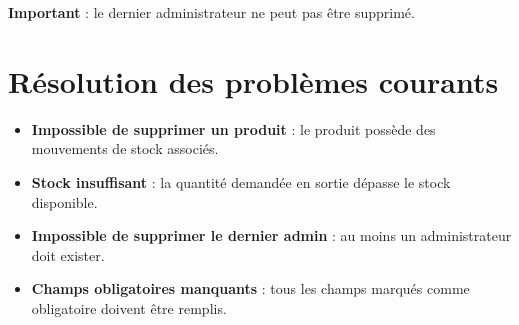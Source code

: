 \documentclass[12pt, a4paper]{article}
\begin{document}
	\textbf{Important} : le dernier administrateur ne peut pas être supprimé.
	
	\section{Résolution des problèmes courants}
	\begin{itemize}
		\item \textbf{Impossible de supprimer un produit} : le produit possède des mouvements de stock associés.
		\item \textbf{Stock insuffisant} : la quantité demandée en sortie dépasse le stock disponible.
		\item \textbf{Impossible de supprimer le dernier admin} : au moins un administrateur doit exister.
		\item \textbf{Champs obligatoires manquants} : tous les champs marqués comme obligatoire doivent être remplis.
	\end{itemize}
	
\end{document}
